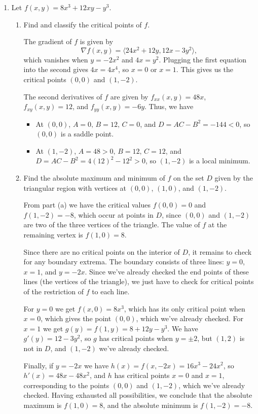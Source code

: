 \documentclass[12pt]{article}
\newcommand{\points}[1]{\marginpar{\hspace{24pt}[#1]}}
\begin{document}
\begin{enumerate}
\item Let $f(x,y) = 8x^3+12xy-y^3$.
\begin{enumerate}
\item Find and classify the critical points of $f$. \points{8}

The gradient of $f$ is given by
\[
\nabla f(x,y) = \langle 24x^2+12y, 12x-3y^2\rangle,
\]
which vanishes when $y=-2x^2$ and $4x=y^2$. Plugging the first equation into the second gives $4x=4x^4$, so $x=0$ or $x=1$. This gives us the critical points $(0,0)$ and $(1,-2)$.

The second derivatives of $f$ are given by $f_{xx}(x,y) = 48x$, $f_{xy}(x,y) = 12$, and $f_{yy}(x,y) = -6y$. Thus, we have
\begin{itemize}
\item At $(0,0)$, $A=0, \, B= 12,\, C=0$, and $D = AC-B^2=-144<0$, so $(0,0)$ is a saddle point.
\item At $(1,-2)$, $A=48>0,\, B=12,\, C=12$, and $D = AC-B^2 = 4(12)^2-12^2>0$, so $(1,-2)$ is a local minimum.
\end{itemize}

\bigskip

\item Find the absolute maximum and minimum of $f$ on the set $D$ given by the triangular region with vertices at $(0,0)$, $(1,0)$, and $(1,-2)$. \points{7}

\bigskip

From part (a) we have the critical values $f(0,0)=0$ and $f(1,-2) = -8$, which occur at points in $D$, since $(0,0)$ and $(1,-2)$ are two of the three vertices of the triangle. The value of $f$ at the remaining vertex is $f(1,0) = 8$.

Since there are no critical points on the interior of $D$, it remains to check for any boundary extrema. The boundary consists of three lines: $y=0$, $x=1$, and $y=-2x$. Since we've already checked the end points of these lines (the vertices of the triangle), we just have to check for critical points of the restriction of $f$ to each line.

For $y=0$ we get $f(x,0) = 8x^3$, which has its only critical point when $x=0$, which gives the point $(0,0)$, which we've already checked. For $x=1$ we get $g(y) = f(1,y) = 8+12y-y^3$. We have $g'(y) = 12-3y^2$, so $g$ has critical points when $y=\pm 2$, but $(1,2)$ is not in $D$, and $(1,-2)$ we've already checked.

Finally, if $y=-2x$ we have $h(x) = f(x,-2x) = 16x^3-24x^2$, so $h'(x) = 48x-48x^2$, and $h$ has critical points $x=0$ and $x=1$, corresponding to the points $(0,0)$ and $(1,-2)$, which we've already checked. Having exhausted all possibilities, we conclude that the absolute maximum is $f(1,0)=8$, and the absolute minimum is $f(1,-2)=-8$.
\end{enumerate}
\newpage


\end{enumerate}
\end{document}
